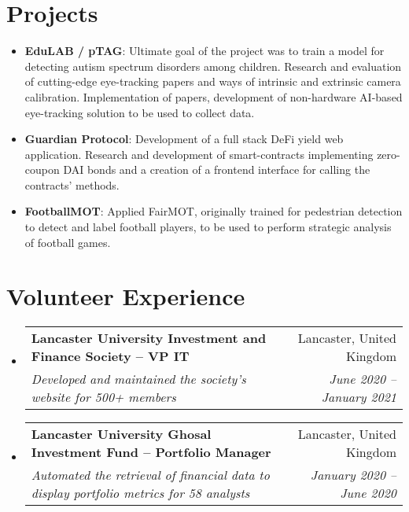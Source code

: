 \documentclass[a4paper]{article}
\makeatletter
\newcommand{\resumeItem}[2]{
  \item\small{
    \textbf{#1}{: #2 \vspace{-2pt}}
  }
}
\newcommand{\resumeSubheading}[4]{
  \vspace{-1pt}\item
    \begin{tabular*}{0.97\textwidth}{l@{\extracolsep{\fill}}r}
      \textbf{#1} & #2 \\
      \textit{#3} & \textit{#4} \\
    \end{tabular*}\vspace{-5pt}
}
\newcommand{\resumeSubItem}[2]{\resumeItem{#1}{#2}\vspace{-3pt}}
\newcommand{\resumeSubHeadingListStart}{\begin{itemize}[leftmargin=*]}
\newcommand{\resumeSubHeadingListEnd}{\end{itemize}}
\makeatother
\begin{document}
\section{Projects}
\resumeSubHeadingListStart
\resumeSubItem{EduLAB / pTAG}{Ultimate goal of the project was to train a model for detecting autism spectrum disorders among children. Research and evaluation of cutting-edge eye-tracking papers and ways of intrinsic and extrinsic camera calibration. Implementation of papers, development of non-hardware AI-based eye-tracking solution to be used to collect data.}
\vspace{2pt}
\resumeSubItem{Guardian Protocol}{Development of a full stack DeFi yield web application. Research and development of smart-contracts implementing zero-coupon DAI bonds and a creation of a frontend interface for calling the contracts’ methods.}
\resumeSubItem{FootballMOT}{Applied FairMOT, originally trained for pedestrian detection to detect and label football players, to be used to perform strategic analysis of football games.}
\resumeSubHeadingListEnd

\vspace{-5pt}
\section{Volunteer Experience}
  \resumeSubHeadingListStart
    \resumeSubheading
    {Lancaster University Investment and Finance Society – VP IT}{Lancaster, United Kingdom}
    {Developed and maintained the society's website for 500+ members}{June 2020 – January 2021}
\vspace{5pt}
    \resumeSubheading
    {Lancaster University Ghosal Investment Fund – Portfolio Manager}{Lancaster, United Kingdom}
    {Automated the retrieval of financial data to display portfolio metrics for 58 analysts}{January 2020 – June 2020}

\resumeSubHeadingListEnd
\end{document}
